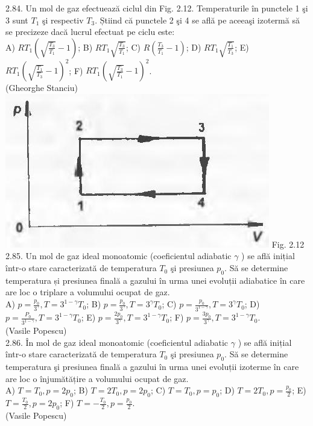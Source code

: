 2.84. Un mol de gaz efectuează ciclul din Fig. 2.12. Temperaturile în punctele 1 şi 3 sunt $T_{1}$ şi respectiv $T_{3}$. Știind că punctele 2 şi 4 se află pe aceeaşi izotermă să se precizeze dacă lucrul efectuat pe ciclu este:\\ A) $R T_{1}\left(\sqrt{\frac{T_{3}}{T_{1}}}-1\right)$; B) $R T_{1} \sqrt{\frac{T_{3}}{T_{1}}}$; C) $R\left(\frac{T_{3}}{T_{1}}-1\right)$; D) $R T_{1} \sqrt{\frac{T_{1}}{T_{3}}}$; E) $R T_{1}\left(\sqrt{\frac{T_{1}}{T_{3}}}-1\right)^{2}$; F) $R T_{1}\left(\sqrt{\frac{T_{3}}{T_{1}}}-1\right)^{2}$.\\ (Gheorghe Stanciu)\\ \includegraphics[width=0.4\linewidth]{images/2025_07_01_5b3ff9fa0d508c8e9f17g-092(1)} Fig. 2.12\\

2.85. Un mol de gaz ideal monoatomic (coeficientul adiabatic $\gamma$ ) se află inițial într-o stare caracterizată de temperatura $T_{0}$ şi presiunea $p_{0}$. Să se determine temperatura și presiunea finală a gazului în urma unei evoluții adiabatice în care are loc o triplare a volumului ocupat de gaz.\\ A) $p=\frac{p_{0}}{3^{\gamma}}, T=3^{1-\gamma} T_{0}$; B) $p=\frac{p_{0}}{3^{\gamma}}, T=3^{\gamma} T_{0}$; C) $p=\frac{p_{0}}{3^{1-\gamma}}, T=3^{\gamma} T_{0}$; D) $p=\frac{P_{0}}{3^{1-\gamma}}, T=3^{1-\gamma} T_{0}$; E) $p=\frac{2 p_{0}}{3^{\gamma}}, T=3^{1-\gamma} T_{0}$; F) $p=\frac{3 p_{0}}{3^{\gamma}}, T=3^{1-\gamma} T_{0}$.\\ (Vasile Popescu)\\

2.86. În mol de gaz ideal monoatomic (coeficientul adiabatic $\gamma$ ) se află inițial într-o stare caracterizată de temperatura $T_{0}$ şi presiunea $p_{0}$. Să se determine temperatura şi presiunea finală a gazului în urma unei evoluții izoterme în care are loc o înjumătățire a volumului ocupat de gaz.\\ A) $T=T_{0}, p=2 p_{0}$; B) $T=2 T_{0}, p=2 p_{0}$; C) $T=T_{0}, p=p_{0}$; D) $T=2 T_{0}, p=\frac{p_{0}}{2}$; E) $T=\frac{T_{0}}{2}, p=2 p_{0}$; F) $T=-\frac{T_{0}}{2}, p=\frac{p_{0}}{2}$.\\ (Vasile Popescu)\\

